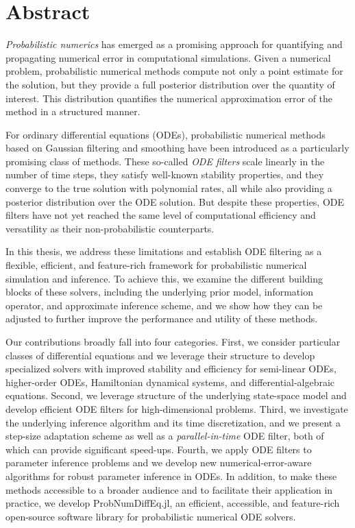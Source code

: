 \documentclass{mimosis}
\begin{document}
\thispagestyle{empty}
\newpage
\chapter{Abstract}
\label{sec:orgfc790a0}

\emph{Probabilistic numerics} has emerged as a promising approach for quantifying and propagating numerical error in computational simulations.
Given a numerical problem, probabilistic numerical methods compute not only a point estimate for the solution, but they provide a full posterior distribution over the quantity of interest.
This distribution quantifies the numerical approximation error of the method in a structured manner.

For ordinary differential equations (ODEs), probabilistic numerical methods based on Gaussian filtering and smoothing have been introduced as a particularly promising class of methods.
These so-called \emph{ODE filters} scale linearly in the number of time steps, they satisfy well-known stability properties, and they converge to the true solution with polynomial rates, all while also providing a posterior distribution over the ODE solution.
But despite these properties, ODE filters have not yet reached the same level of computational efficiency and versatility as their non-probabilistic counterparts.

In this thesis, we address these limitations and establish ODE filtering as a flexible, efficient, and feature-rich framework for probabilistic numerical simulation and inference.
To achieve this, we examine the different building blocks of these solvers, including the underlying prior model, information operator, and approximate inference scheme, and we show how they can be adjusted to further improve the performance and utility of these methods.

Our contributions broadly fall into four categories.
First, we consider particular classes of differential equations and we leverage their structure to develop specialized solvers
with improved stability and efficiency
for
semi-linear ODEs,
higher-order ODEs,
Hamiltonian dynamical systems,
and differential-algebraic equations.
Second, we leverage structure of the underlying state-space model and develop efficient ODE filters for high-dimensional problems.
Third, we investigate the underlying inference algorithm and its time discretization, and we present a step-size adaptation scheme as well as a \emph{parallel-in-time} ODE filter, both of which can provide significant speed-ups.
Fourth, we apply ODE filters to parameter inference problems and we develop new numerical-error-aware algorithms for robust parameter inference in ODEs.
In addition, to make these methods accessible to a broader audience and to facilitate their application in practice, we develop ProbNumDiffEq.jl, an efficient, accessible, and feature-rich open-source software library for probabilistic numerical ODE solvers.
\end{document}
